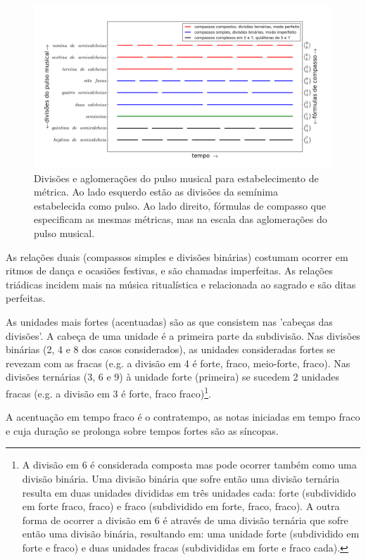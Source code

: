 \begin{figure}[h!]
    \centering
        \includegraphics[width=\textwidth]{figuras/metricaMusical}
    \caption{Divisões e aglomerações do pulso musical para estabelecimento de métrica. Ao lado esquerdo estão as divisões da semínima estabelecida como pulso. Ao lado direito, fórmulas de compasso que especificam as mesmas métricas, mas na escala das aglomerações do pulso musical.}
        \label{fig:pulsoSubAgl}
\end{figure}

As relações duais (compassos simples e divisões binárias) costumam ocorrer em ritmos de dança
e ocasiões festivas, e são chamadas imperfeitas. As relações triádicas
incidem mais na música ritualística e relacionada ao sagrado
e são ditas perfeitas.

As unidades mais fortes (acentuadas) são as que consistem nas 'cabeças das divisões'. A cabeça de uma unidade é a primeira parte da subdivisão. Nas divisões binárias (2, 4 e 8 dos casos considerados),
as unidades consideradas fortes se revezam com as fracas
(e.g. a divisão em 4 é forte, fraco, meio-forte, fraco).
Nas divisões ternárias (3, 6 e 9)
à unidade forte (primeira) se sucedem 2 unidades fracas (e.g. a divisão em 3 é forte, fraco fraco)\footnote{A divisão em 6 é considerada composta
 mas pode ocorrer também como uma divisão binária.
 Uma divisão binária que sofre então uma divisão ternária
 resulta em duas unidades divididas em três unidades cada: forte (subdividido em forte fraco, fraco) e fraco (subdividido em forte, fraco, fraco).
A outra forma de ocorrer a divisão em 6 é através de 
uma divisão ternária que sofre então uma divisão binária, resultando em:
uma unidade forte (subdividido em forte e fraco) e duas unidades fracas (subdivididas em forte e fraco cada).}.

A acentuação em tempo fraco é o contratempo, as notas iniciadas em tempo fraco e cuja duração se prolonga sobre tempos fortes são as síncopas.

